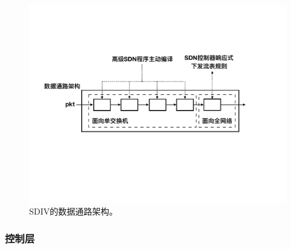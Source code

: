 \begin{figure} [t]
\begin{center}
\includegraphics[width=0.8\columnwidth]{figures/sdiv-dp.pdf}
\vspace{-0.2in}
\caption{SDIV的数据通路架构。} \label{fig:sdiv-dp}
\end{center}
\vspace{-0.3in}
\end{figure}



\subsubsection{控制层}

